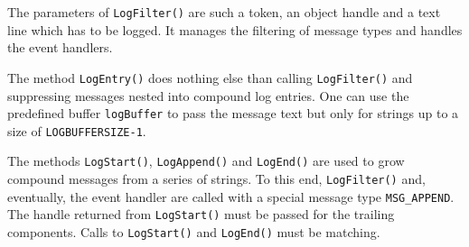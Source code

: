 \documentclass[a4paper,11pt,twoside]{book}
\begin{document}
\begin{multicols}{2}
The parameters of \verb/LogFilter()/ are such a token, an object handle and a
text line which has to be logged. It manages the filtering of message types
and handles the event handlers.

The method \verb/LogEntry()/ does nothing else than calling \verb/LogFilter()/
and suppressing messages nested into compound log entries. One can use the
predefined buffer \verb/logBuffer/ to pass the message text but only for
strings up to a size of \verb/LOGBUFFERSIZE-1/.

The methods \verb/LogStart()/, \verb/LogAppend()/ and \verb/LogEnd()/ are used
to grow compound messages from a series of strings. To this end,
\verb/LogFilter()/ and, eventually, the event handler are called with a special
message type \verb/MSG_APPEND/. The handle returned from \verb/LogStart()/ must
be passed for the trailing components. Calls to \verb/LogStart()/ and
\verb/LogEnd()/ must be matching.

% 
% 
% 


\end{multicols}
\end{document}
